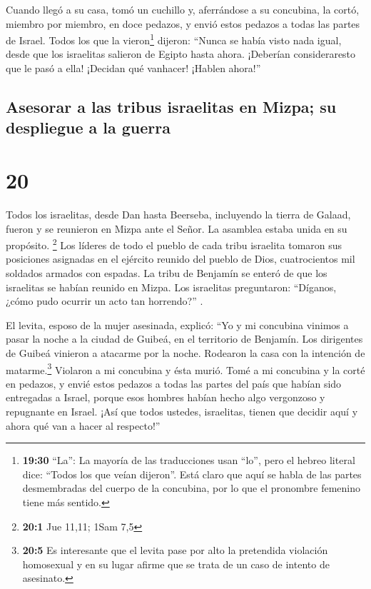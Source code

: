 Cuando llegó a su casa, tomó un cuchillo y, aferrándose
a su concubina, la cortó, miembro por miembro, en doce pedazos, y envió
estos pedazos a todas las partes de Israel.  Todos los
que la vieron\footnote{\textbf{19:30} ``La'': La mayoría de las
  traducciones usan ``lo'', pero el hebreo literal dice: ``Todos los que
  veían dijeron''. Está claro que aquí se habla de las partes
  desmembradas del cuerpo de la concubina, por lo que el pronombre
  femenino tiene más sentido.} dijeron: ``Nunca se había visto nada
igual, desde que los israelitas salieron de Egipto hasta ahora.
¡Deberían consideraresto que le pasó a ella! ¡Decidan qué vanhacer!
¡Hablen ahora!''

\hypertarget{asesorar-a-las-tribus-israelitas-en-mizpa-su-despliegue-a-la-guerra}{%
\subsection{Asesorar a las tribus israelitas en Mizpa; su despliegue a
la
guerra}\label{asesorar-a-las-tribus-israelitas-en-mizpa-su-despliegue-a-la-guerra}}

\hypertarget{section-19}{%
\section{20}\label{section-19}}

 Todos los israelitas, desde Dan hasta Beerseba,
incluyendo la tierra de Galaad, fueron y se reunieron en Mizpa ante el
Señor. La asamblea estaba unida en su propósito. \footnote{\textbf{20:1}
  Jue 11,11; 1Sam 7,5}  Los líderes de todo el pueblo de
cada tribu israelita tomaron sus posiciones asignadas en el ejército
reunido del pueblo de Dios, cuatrocientos mil soldados armados con
espadas.  La tribu de Benjamín se enteró de que los
israelitas se habían reunido en Mizpa. Los israelitas preguntaron:
``Díganos, ¿cómo pudo ocurrir un acto tan horrendo?'' .

 El levita, esposo de la mujer asesinada, explicó: ``Yo y
mi concubina vinimos a pasar la noche a la ciudad de Guibeá, en el
territorio de Benjamín.  Los dirigentes de Guibeá vinieron
a atacarme por la noche. Rodearon la casa con la intención de
matarme.\footnote{\textbf{20:5} Es interesante que el levita pase por
  alto la pretendida violación homosexual y en su lugar afirme que se
  trata de un caso de intento de asesinato.} Violaron a mi concubina y
ésta murió.  Tomé a mi concubina y la corté en pedazos, y
envié estos pedazos a todas las partes del país que habían sido
entregadas a Israel, porque esos hombres habían hecho algo vergonzoso y
repugnante en Israel.  ¡Así que todos ustedes, israelitas,
tienen que decidir aquí y ahora qué van a hacer al respecto!''

